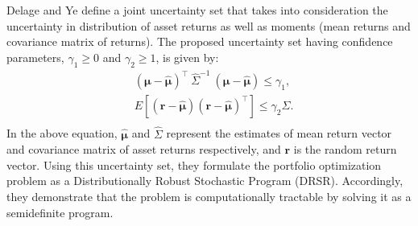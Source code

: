 Delage and Ye \cite{delage} define a joint uncertainty set that takes into consideration the uncertainty in distribution of asset returns as well as moments (mean returns and covariance matrix of returns). The proposed uncertainty set having confidence parameters, $\gamma_{1} \geq 0$ and $\gamma_{2} \geq 1$, is given by:
\begin{equation}
\begin{split}
    & (\boldsymbol{\mu} - \boldsymbol{\hat{\mu}})^{\top} \ \hat{\Sigma}^{-1} \ (\boldsymbol{\mu} - \boldsymbol{\hat{\mu}}) \leq \gamma_{1}, \\
    & E[(\mathbf{r} - \boldsymbol{\hat{\mu}})(\mathbf{r} - \boldsymbol{\hat{\mu}})^{\top}] \leq \gamma_{2}\hat{\Sigma}. \\
\end{split}
\end{equation}
In the above equation, $\boldsymbol{\hat{\mu}}$ and $\hat{\Sigma}$ represent the estimates of mean return vector and covariance matrix of asset returns respectively, and $\mathbf{r}$ is the random return vector. Using this uncertainty set, they formulate the portfolio optimization problem as a Distributionally Robust Stochastic Program (DRSR). Accordingly, they demonstrate that the problem is computationally tractable by solving it as a semidefinite program. 

